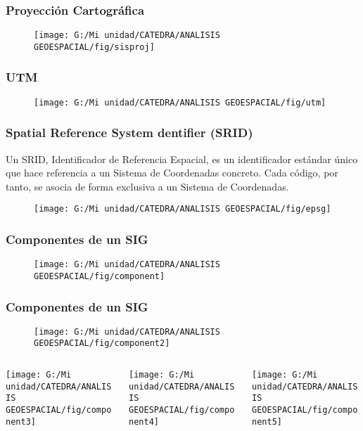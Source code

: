 \documentclass[14pt]{beamer}
\begin{document}
\begin{frame}
\frametitle{Proyección Cartográfica}
  \begin{figure}
    \centering
    \texttt{[image: G:/Mi unidad/CATEDRA/ANALISIS GEOESPACIAL/fig/sisproj]}
  \end{figure}
\end{frame}
\begin{frame}
\frametitle{UTM}
  \begin{figure}
    \centering
    \texttt{[image: G:/Mi unidad/CATEDRA/ANALISIS GEOESPACIAL/fig/utm]}
  \end{figure}
\end{frame}
\begin{frame}
\frametitle{Spatial Reference System dentifier (SRID)}
\scriptsize{Un SRID, Identificador de Referencia Espacial, es un identificador estándar único que hace referencia a un Sistema de Coordenadas concreto. Cada código, por tanto, se asocia de forma exclusiva a un Sistema de Coordenadas.}
  \begin{figure}
    \centering
    \texttt{[image: G:/Mi unidad/CATEDRA/ANALISIS GEOESPACIAL/fig/epsg]}
  \end{figure}
\end{frame}
\begin{frame}
\frametitle{Componentes de un SIG}
  \begin{figure}
    \centering
    \texttt{[image: G:/Mi unidad/CATEDRA/ANALISIS GEOESPACIAL/fig/component]}
  \end{figure}
\end{frame}
\begin{frame}
\frametitle{Componentes de un SIG}
  \begin{figure}
    \centering
    \texttt{[image: G:/Mi unidad/CATEDRA/ANALISIS GEOESPACIAL/fig/component2]}
   \end{figure}
\begin{columns}
		\begin{column}{.33\linewidth}
		 \texttt{[image: G:/Mi unidad/CATEDRA/ANALISIS GEOESPACIAL/fig/component3]}
		\end{column}
		\begin{column}{.33\linewidth}
			 \texttt{[image: G:/Mi unidad/CATEDRA/ANALISIS GEOESPACIAL/fig/component4]}
		\end{column}
		\begin{column}{.33\linewidth}
			 \texttt{[image: G:/Mi unidad/CATEDRA/ANALISIS GEOESPACIAL/fig/component5]}
		\end{column}
	\end{columns}
\end{frame}
\end{document}
